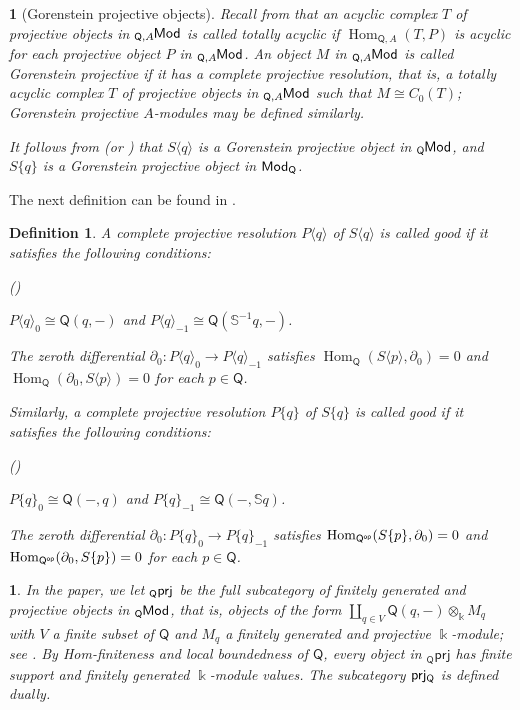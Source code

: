 \documentclass{amsart}
\theoremstyle{bfupright head,slanted body}
\theoremstyle{bfupright head,upright body}
\newtheorem{bfhpg}[res]{}               \newtheorem*{bfhpg*}{}
\theoremstyle{fixed bf head,slanted body}
\theoremstyle{fixed bf head,upright body}
\newtheorem{dfn}[res]{Definition}       \newtheorem*{dfn*}{Definition}
\theoremstyle{numbered paragraph}
\newtheorem{ipg}[res]{}
\newlength{\thmlistleft}        %
\newlength{\thmlistright}       %
\newlength{\thmlistpartopsep}   %
\newlength{\thmlisttopsep}      %
\newlength{\thmlistparsep}      %
\newlength{\thmlistitemsep}     %
\newcounter{prt}
\newenvironment{prt}{\begin{list}{\upshape (\alph{prt})}%
		{\usecounter{prt}%
			\setlength{\leftmargin}{\thmlistleft}%
			\setlength{\labelwidth}{\thmlistleft}%
			\setlength{\rightmargin}{\thmlistright}%
			\setlength{\partopsep}{\thmlistpartopsep}%
			\setlength{\topsep}{\thmlisttopsep}%
			\setlength{\parsep}{\thmlistparsep}%
			\setlength{\itemsep}{\thmlistitemsep}}}%
	{\end{list}}%
\numberwithin{equation}{res}
\newcommand{\Hom}{\operatorname{Hom}}
\newcommand{\Q}{\mathsf{Q}}
\newcommand{\Qop}{\Q^{\sf op}}
\newcommand{\kk}{\Bbbk}
\newcommand{\is}{\cong}
\newcommand{\lMod}[1]{{}_{#1}\mspace{-1mu}{\sf{Mod}}}
\newcommand{\rMod}[1]{{\sf{Mod}}_{#1}}
\begin{document}
\begin{bfhpg}[Gorenstein projective objects]
Recall from \cite{EnochsGP} that an acyclic complex $T$ of projective objects in $\lMod{\Q,A}$ is called \emph{totally acyclic} if $\Hom_{\Q,A}(T,P)$ is acyclic for each projective object $P$ in $\lMod{\Q,A}$. An object $M$ in $\lMod{\Q,A}$ is called \emph{Gorenstein projective} if it has a complete projective resolution, that is, a totally acyclic complex $T$ of projective objects in $\lMod{\Q,A}$ such that $M\is C_0(T)$; Gorenstein projective $A$-modules may be defined similarly.

It follows from \cite[Corollary 4.8]{DSS17} (or \cite[Theorem B]{DLLM}) that $S\langle q\rangle$ is a Gorenstein projective object in $\lMod{\Q}$, and $S\{q\}$ is a Gorenstein projective object in $\rMod{\Q}$.
\end{bfhpg}

The next definition can be found in \cite[Definitions 2.4 and 2.5]{HJ26}.

\begin{dfn}\label{dfn:good}
A complete projective resolution $P\langle q\rangle$ of $S\langle q\rangle$ is called \emph{good} if it satisfies the following conditions:
\begin{prt}
\item $P\langle q\rangle_0\is\Q(q,-)$ and $P\langle q\rangle_{-1}\is\Q(\mathbb{S}^{-1}q,-)$.
\item The zeroth differential $\partial_0: P\langle q\rangle_0 \to P\langle q\rangle_{-1}$ satisfies $\Hom_{\Q}(S\langle p\rangle, \partial_0)=0$ and $\Hom_{\Q}(\partial_0, S\langle p\rangle)=0$ for each $p\in\Q$.
\end{prt}

Similarly, a complete projective resolution $P\{q\}$ of $S\{q\}$ is called \emph{good} if it satisfies the following conditions:
\begin{prt}
\item[(a')] $P\{q\}_0\is\Q(-,q)$ and $P\{q\}_{-1}\is\Q(-,\mathbb{S}q)$.
\item[(b')] The zeroth differential $\partial_0: P\{q\}_0 \to P\{q\}_{-1}$ satisfies $\Hom_{\Qop}(S\{p\}, \partial_0)=0$ and $\Hom_{\Qop}(\partial_0, S\{p\})=0$ for each $p\in\Q$.
\end{prt}
\end{dfn}

\begin{ipg}\label{finite-generated}
In the paper, we let ${}_\Q\sf prj$ be the full subcategory of finitely generated and
projective objects in $\lMod{\Q}$, that is, objects of the form $\coprod_{q\in V}\Q(q,-)\otimes_\kk M_q$ with $V$ a finite subset of $\Q$ and $M_q$ a finitely generated and projective $\kk$-module; see \cite[Definition 1.1]{HJ26}. By Hom-finiteness and local boundedness of $\Q$, every object in ${}_\Q\mathsf{prj}$ has finite support and finitely generated $\kk$-module values. The subcategory $\sf prj_\Q$ is defined dually.
\end{ipg}
\end{document}
